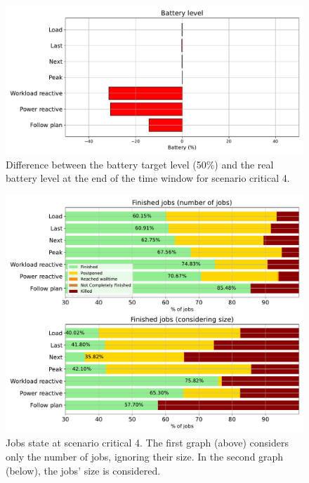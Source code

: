 \begin{figure}[!htb]
    \centering
    \includegraphics[scale=0.55]{Images/Compensations/battery_critical_4.pdf}
    \caption{Difference between the battery target level (50\%) and the real battery level at the end of the time window for scenario critical 4.}
    \label{fig:SoC_critical_4}
\end{figure}

\begin{figure}[!htb]
    \centering
    \includegraphics[scale=0.55]{Images/Compensations/jobs_critical_4.pdf}
    \caption{Jobs state at scenario critical 4. The first graph (above) considers only the number of jobs, ignoring their size. In the second graph (below), the jobs' size is considered.}
    \label{fig:jobs_critical_4}
\end{figure}


